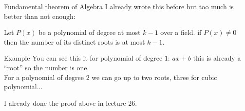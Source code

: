  \begin{parag}{Fundamental theorem of Algebra}
     I already wrote this before but too much is better than not enough:
     \begin{theoreme}
     Let $P\left(x\right)$ be a polynomial of degree at most $k-1$ over a field. if $P\left(x\right) \neq 0$ then the number of its distinct roots is at most $k-1$.
     \end{theoreme}
     \begin{subparag}{Example}
         You can see this it for polynomial of degree $1$: $ax + b$ this is already a ``root'' so the number is one.\\
         For a polynomial of degree $2$ we can go up to two roots, three for cubic polynomial...
     \end{subparag}
     \begin{framedremark}
     I already done the proof above in lecture 26.
     \end{framedremark}
 \end{parag}
 
 
 
 
   
